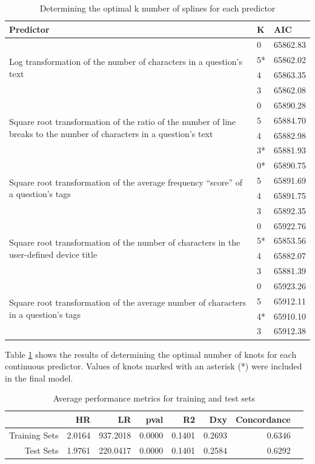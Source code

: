 \documentclass{article}
\begin{document}
\begin{table}[!htbp]
\centering
\caption{Determining the optimal k number of splines for each predictor} 
\begin{tabular}{| p{5cm} | l | l |}
  \hline
  Predictor & K & AIC \\ 
  \hline
  \multirow{ 4 }{ 5cm }{Log transformation of the number of characters in a question's text} 
  & 0 & 65862.83 \\ 
  & 5* & 65862.02 \\ 
  & 4 & 65863.35 \\ 
  & 3 & 65862.08 \\ 
  \hline
  \multirow{ 4 }{ 5 cm }{Square root transformation of the ratio of the number of line breaks to the number of characters in a question's text}
  & 0 & 65890.28 \\ 
  & 5 & 65884.70 \\ 
  & 4 & 65882.98 \\ 
  & 3* & 65881.93 \\ 
  \hline
  \multirow{ 4 }{ 5 cm }{Square root transformation of the average frequency ``score'' of a question's tags}
  & 0* & 65890.75 \\ 
  & 5 & 65891.69 \\ 
  & 4 & 65891.75 \\ 
  & 3 & 65892.35 \\ 
  \hline
  \multirow{ 4 }{ 5 cm }{Square root transformation of the number of characters in the user-defined device title}
  & 0 & 65922.76 \\ 
  & 5* & 65853.56 \\ 
  & 4 & 65882.07 \\ 
  & 3 & 65881.39 \\ 
  \hline
  \multirow{ 4 }{ 5 cm }{Square root transformation of the average number of characters in a question's tags}
  & 0 & 65923.26 \\ 
  & 5 & 65912.11 \\ 
  & 4* & 65910.10 \\ 
  & 3 & 65912.38 \\ 
   \hline
\end{tabular}
\label{table:splines}
\end{table}

Table \ref{table:splines} shows the results of determining the optimal number of knots for each continuous predictor. Values of knots marked with an asterisk (*) were included in the final model. 

\begin{table}[!htbp]
\centering
\caption{Average performance metrics for training and test sets} 
\begin{tabular}{rrrrrrrr}
  \hline
 & HR & LR & pval & R2 & Dxy & Concordance \\ 
  \hline
  Training Sets & 2.0164 & 937.2018 & 0.0000 & 0.1401 & 0.2693 & 0.6346 \\ 
  Test Sets & 1.9761 & 220.0417 & 0.0000 & 0.1401 & 0.2584 & 0.6292 \\
   \hline
\end{tabular}
\label{table:cv}
\end{table}
\end{document}
